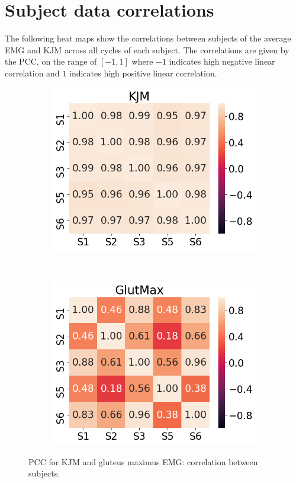 \section{Subject data correlations}
\label{sec:A-data-correlations}
The following heat maps show the correlations between subjects of the average \ac{EMG} and \ac{KJM} across all cycles of each subject.
The correlations are given by the \ac{PCC}, on the range of $[-1, 1]$ where $-1$ indicates high negative linear correlation and $1$ indicates high positive linear correlation.
\begin{figure}[!htb]
     \centering
     \begin{subfigure}[b]{0.45\textwidth}
         \centering
         \includegraphics[width=\textwidth]{img/results/correlations/KJM_correlation_between_subjects.png}
     \end{subfigure}
     ~
     \begin{subfigure}[b]{0.45\textwidth}
         \centering
         \includegraphics[width=\textwidth]{img/results/correlations/GlutMax_correlation_between_subjects.png}
     \end{subfigure}
    \caption{\ac{PCC} for \ac{KJM} and gluteus maximus \ac{EMG}: correlation between subjects.}
    \label{fig:A-kjm-and-glutmax-correlation}
\end{figure}
